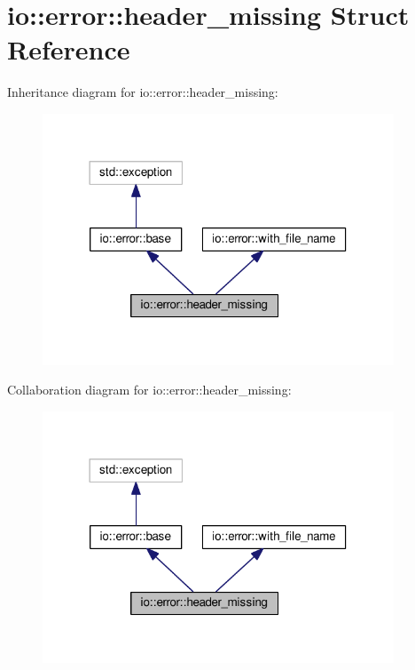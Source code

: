 \section{io\+:\+:error\+:\+:header\+\_\+missing Struct Reference}
\label{structio_1_1error_1_1header__missing}


Inheritance diagram for io\+:\+:error\+:\+:header\+\_\+missing\+:\nopagebreak
\begin{figure}[H]
\begin{center}
\leavevmode
\includegraphics[width=297pt]{structio_1_1error_1_1header__missing__inherit__graph}
\end{center}
\end{figure}


Collaboration diagram for io\+:\+:error\+:\+:header\+\_\+missing\+:\nopagebreak
\begin{figure}[H]
\begin{center}
\leavevmode
\includegraphics[width=297pt]{structio_1_1error_1_1header__missing__coll__graph}
\end{center}
\end{figure}
